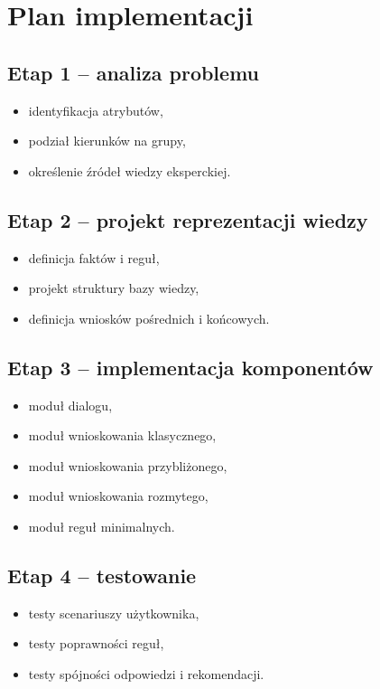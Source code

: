 \documentclass[12pt,a4paper,oneside]{article}
\begin{document}
\section{Plan implementacji}

\subsection{Etap 1 – analiza problemu}
\begin{itemize}[leftmargin=1.2cm]
    \item identyfikacja atrybutów,
    \item podział kierunków na grupy,
    \item określenie źródeł wiedzy eksperckiej.
\end{itemize}

\subsection{Etap 2 – projekt reprezentacji wiedzy}
\begin{itemize}[leftmargin=1.2cm]
    \item definicja faktów i reguł,
    \item projekt struktury bazy wiedzy,
    \item definicja wniosków pośrednich i końcowych.
\end{itemize}

\subsection{Etap 3 – implementacja komponentów}
\begin{itemize}[leftmargin=1.2cm]
    \item moduł dialogu,
    \item moduł wnioskowania klasycznego,
    \item moduł wnioskowania przybliżonego,
    \item moduł wnioskowania rozmytego,
    \item moduł reguł minimalnych.
\end{itemize}

\subsection{Etap 4 – testowanie}
\begin{itemize}[leftmargin=1.2cm]
    \item testy scenariuszy użytkownika,
    \item testy poprawności reguł,
    \item testy spójności odpowiedzi i rekomendacji.
\end{itemize}
\end{document}
